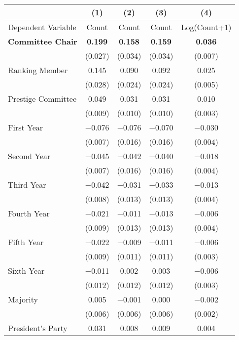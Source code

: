 \begin{tabular}[t]{lcccc}
\toprule
  & (1) & (2) & (3) & (4)\\
\midrule
Dependent Variable & Count & Count & Count & Log(Count+1)\\
\textbf{Committee Chair} & \textbf{\num{0.199}} & \textbf{\num{0.158}} & \textbf{\num{0.159}} & \textbf{\num{0.036}}\\
\midrule
 & (\num{0.027}) & (\num{0.034}) & (\num{0.034}) & (\num{0.007})\\
Ranking Member & \num{0.145} & \num{0.090} & \num{0.092} & \num{0.025}\\
 & (\num{0.028}) & (\num{0.024}) & (\num{0.024}) & (\num{0.005})\\
Prestige Committee & \num{0.049} & \num{0.031} & \num{0.031} & \num{0.010}\\
 & (\num{0.009}) & (\num{0.010}) & (\num{0.010}) & (\num{0.003})\\
First Year & \num{-0.076} & \num{-0.076} & \num{-0.070} & \num{-0.030}\\
 & (\num{0.007}) & (\num{0.016}) & (\num{0.016}) & \vphantom{1} (\num{0.004})\\
Second Year & \num{-0.045} & \num{-0.042} & \num{-0.040} & \num{-0.018}\\
 & (\num{0.007}) & (\num{0.016}) & (\num{0.016}) & (\num{0.004})\\
Third Year & \num{-0.042} & \num{-0.031} & \num{-0.033} & \num{-0.013}\\
 & (\num{0.008}) & (\num{0.013}) & (\num{0.013}) & (\num{0.004})\\
Fourth Year & \num{-0.021} & \num{-0.011} & \num{-0.013} & \num{-0.006}\\
 & (\num{0.009}) & (\num{0.013}) & (\num{0.013}) & (\num{0.004})\\
Fifth Year & \num{-0.022} & \num{-0.009} & \num{-0.011} & \num{-0.006}\\
 & (\num{0.009}) & (\num{0.011}) & (\num{0.011}) & (\num{0.003})\\
Sixth Year & \num{-0.011} & \num{0.002} & \num{0.003} & \num{-0.006}\\
 & (\num{0.012}) & (\num{0.012}) & (\num{0.012}) & (\num{0.003})\\
Majority & \num{0.005} & \num{-0.001} & \num{0.000} & \num{-0.002}\\
 & (\num{0.006}) & (\num{0.006}) & (\num{0.006}) & (\num{0.002})\\
President's Party & \num{0.031} & \num{0.008} & \num{0.009} & \num{0.004}\\

\end{tabular}
